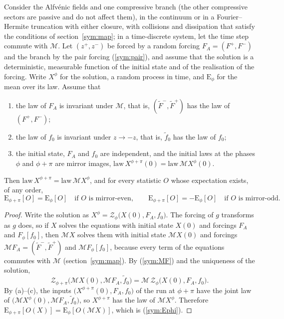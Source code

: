 \begin{theorem}\label{thm:mirror}
Consider the Alfv\'enic fields and one compressive branch (the other compressive sectors are passive and do not affect them), in the continuum or in a Fourier--Hermite truncation with either closure, with collisions and dissipation that satisfy the conditions of section~\ref{sym:map}; in a time-discrete system, let the time step commute with $\mathcal M$. Let $(z^+,z^-)$ be forced by a random forcing $F_A=(F^+,F^-)$ and the branch by the pair forcing (\ref{sym:pair}), and assume that the solution is a deterministic, measurable function of the initial state and of the realisation of the forcing. Write $X^\phi$ for the solution, a random process in time, and $\mathrm E_\phi$ for the mean over its law. Assume that
\begin{enumerate}
  \item[(a)] the law of $F_A$ is invariant under $\mathcal M$, that is, $(\tilde F^-,\tilde F^+)$ has the law of $(F^+,F^-)$;
  \item[(b)] the law of $f_0$ is invariant under $z\to-z$, that is, $\tilde f_0$ has the law of $f_0$;
  \item[(c)] the initial state, $F_A$ and $f_0$ are independent, and the initial laws at the phases $\phi$ and $\phi+\pi$ are mirror images, $\mathrm{law}\,X^{\phi+\pi}(0)=\mathrm{law}\,\mathcal MX^\phi(0)$.
\end{enumerate}
Then $\mathrm{law}\,X^{\phi+\pi}=\mathrm{law}\,\mathcal MX^\phi$, and for every statistic $O$ whose expectation exists, of any order,
\begin{equation}\label{sym:Ephi}
  \mathrm E_{\phi+\pi}[O]=\mathrm E_\phi[O]\quad\text{if $O$ is mirror-even},\qquad
  \mathrm E_{\phi+\pi}[O]=-\mathrm E_\phi[O]\quad\text{if $O$ is mirror-odd}.
\end{equation}
\end{theorem}

\begin{proof}
Write the solution as $X^\phi=\mathcal Z_\phi\big(X(0),F_A,f_0\big)$. The forcing of $g$ transforms as $g$ does, so if $X$ solves the equations with initial state $X(0)$ and forcings $F_A$ and $F_\phi[f_0]$, then $\mathcal MX$ solves them with initial state $\mathcal MX(0)$ and forcings $\mathcal MF_A=(\tilde F^-,\tilde F^+)$ and $\mathcal MF_\phi[f_0]$, because every term of the equations commutes with $\mathcal M$ (section~\ref{sym:map}). By (\ref{sym:MF}) and the uniqueness of the solution,
\begin{equation*}
  \mathcal Z_{\phi+\pi}\big(\mathcal MX(0),\mathcal MF_A,\tilde f_0\big)=\mathcal M\,\mathcal Z_\phi\big(X(0),F_A,f_0\big).
\end{equation*}
By (a)--(c), the inputs $\big(X^{\phi+\pi}(0),\allowbreak F_A,\allowbreak f_0\big)$ of the run at $\phi+\pi$ have the joint law of $\big(\mathcal MX^\phi(0),\allowbreak\mathcal MF_A,\allowbreak\tilde f_0\big)$, so $X^{\phi+\pi}$ has the law of $\mathcal MX^\phi$. Therefore $\mathrm E_{\phi+\pi}[O(X)]=\mathrm E_\phi[O(\mathcal MX)]$, which is (\ref{sym:Ephi}).
\end{proof}

